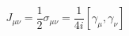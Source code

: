 \begin{equation} 
J_{\mu \nu} = \frac{1}{2} \sigma_{\mu \nu} = 
\frac{1}{4i} [\gamma_{\mu}, \gamma_{\nu}]  
\end{equation} 
